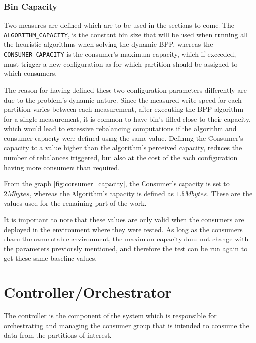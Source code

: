 \subsubsection{Bin Capacity} \label{result:bin capacity}

Two measures are defined which are to be used in the sections to come. The
        \lstinline[language=Python]{ALGORITHM_CAPACITY}, is the constant bin
        size that will be used when running all the heuristic algorithms when
        solving the dynamic BPP, whereas the
        \lstinline[language=Python]{CONSUMER_CAPACITY} is the consumer's maximum
        capacity, which if exceeded, must trigger a new configuration as for
        which partition should be assigned to which consumers.

The reason for having defined these two configuration parameters differently are
        due to the problem's dynamic nature. Since the measured write speed for
        each partition varies between each measurement, after executing the BPP
        algorithm for a single measurement, it is common to have bin's filled
        close to their capacity, which would lead to excessive rebalancing
        computations if the algorithm and consumer capacity were defined using
        the same value. Defining the Consumer's capacity to a value higher than
        the algorithm's perceived capacity, reduces the number of rebalances
        triggered, but also at the cost of the each configuration having more
        consumers than required. 

From the graph \ref{fig:consumer_capacity}, the Consumer's capacity is set to $2
        Mbytes$, whereas the Algorithm's capacity is defined as $1.5 Mbytes$.
        These are the values used for the remaining part of the work.

It is important to note that these values are only valid when the consumers are
        deployed in the environment where they were tested. As long as the
        consumers share the same stable environment, the maximum capacity does
        not change with the parameters previously mentioned, and therefore the
        test can be run again to get these same baseline values. 

\section{Controller/Orchestrator} \label{component:controller}

The controller is the component of the system which is responsible for
orchestrating and managing the consumer group that is intended to consume the
data from the partitions of interest. 

